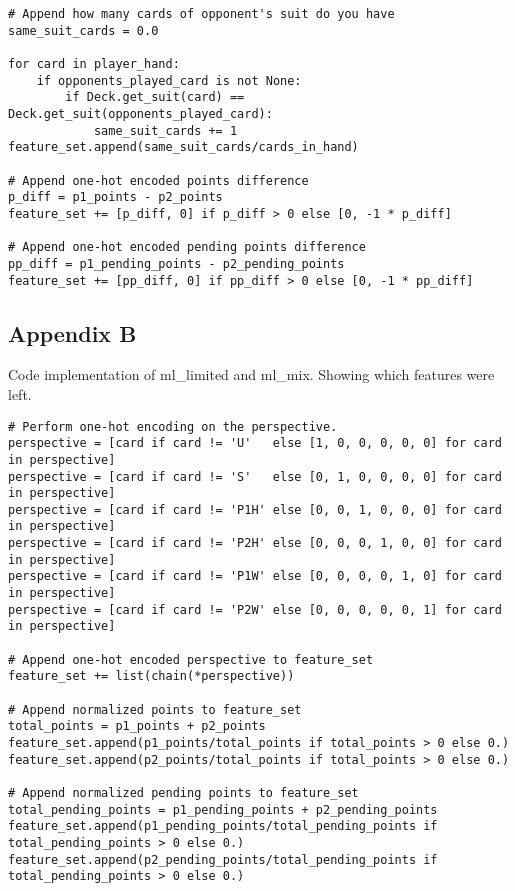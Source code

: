 \documentclass[master]{subfiles}
\begin{document}
\begin{Verbatim}
# Append how many cards of opponent's suit do you have
same_suit_cards = 0.0

for card in player_hand:
    if opponents_played_card is not None:
        if Deck.get_suit(card) == Deck.get_suit(opponents_played_card):
            same_suit_cards += 1
feature_set.append(same_suit_cards/cards_in_hand)

# Append one-hot encoded points difference
p_diff = p1_points - p2_points
feature_set += [p_diff, 0] if p_diff > 0 else [0, -1 * p_diff]

# Append one-hot encoded pending points difference
pp_diff = p1_pending_points - p2_pending_points
feature_set += [pp_diff, 0] if pp_diff > 0 else [0, -1 * pp_diff]
\end{Verbatim}
\subsection{Appendix B}
Code implementation of ml\_limited and ml\_mix. Showing which features were left.
\begin{Verbatim}
# Perform one-hot encoding on the perspective.
perspective = [card if card != 'U'   else [1, 0, 0, 0, 0, 0] for card in perspective]
perspective = [card if card != 'S'   else [0, 1, 0, 0, 0, 0] for card in perspective]
perspective = [card if card != 'P1H' else [0, 0, 1, 0, 0, 0] for card in perspective]
perspective = [card if card != 'P2H' else [0, 0, 0, 1, 0, 0] for card in perspective]
perspective = [card if card != 'P1W' else [0, 0, 0, 0, 1, 0] for card in perspective]
perspective = [card if card != 'P2W' else [0, 0, 0, 0, 0, 1] for card in perspective]

# Append one-hot encoded perspective to feature_set
feature_set += list(chain(*perspective))

# Append normalized points to feature_set
total_points = p1_points + p2_points
feature_set.append(p1_points/total_points if total_points > 0 else 0.)
feature_set.append(p2_points/total_points if total_points > 0 else 0.)

# Append normalized pending points to feature_set
total_pending_points = p1_pending_points + p2_pending_points
feature_set.append(p1_pending_points/total_pending_points if total_pending_points > 0 else 0.)
feature_set.append(p2_pending_points/total_pending_points if total_pending_points > 0 else 0.)
\end{Verbatim}
\end{document}
